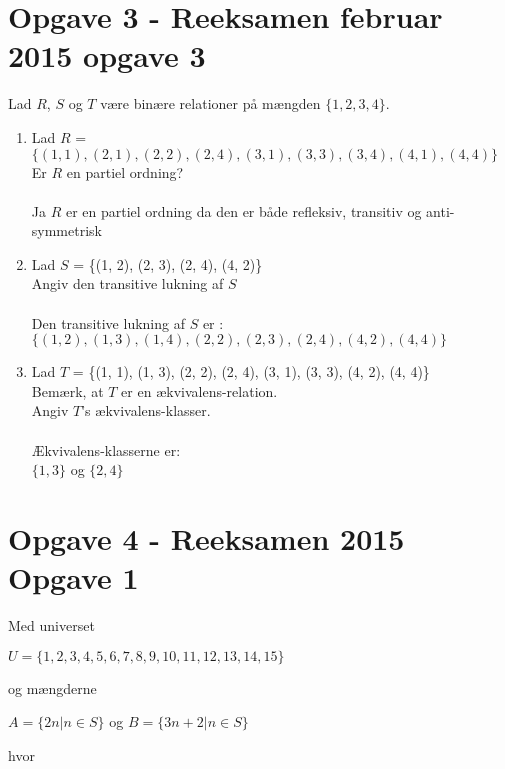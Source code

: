 \documentclass[20pt]{article}
\begin{document}
	\section*{Opgave 3 - Reeksamen februar 2015 opgave 3}
Lad \(R\), \(S\) og \(T\) være binære relationer på mængden \(\{1, 2, 3, 4\}\).
\begin{enumerate}[label=(\alph*)]
	\item 
	Lad \(R\) = \(\{(1, 1), (2, 1), (2, 2), (2, 4), (3, 1), (3, 3), (3, 4), (4, 1), (4, 4)\}\)\\
	Er \(R\) en partiel ordning?\\ \\
	Ja \(R\) er en partiel ordning da den er både refleksiv, transitiv og anti-symmetrisk\\
	\item
	Lad \(S\) = \{(1, 2), (2, 3), (2, 4), (4, 2)\}\\
	Angiv den transitive lukning af \(S\) \\ \\
	Den transitive lukning af \(S\) er : \\
	\(\{(1, 2), (1, 3), (1, 4), (2, 2), (2, 3), (2, 4), (4, 2), (4, 4)\}\)\\
	\item
	Lad \(T\) = \{(1, 1), (1, 3), (2, 2), (2, 4), (3, 1), (3, 3), (4, 2), (4, 4)\}\\
	Bemærk, at \(T\) er en ækvivalens-relation.\\
	Angiv \(T\)'s ækvivalens-klasser.\\ \\
	Ækvivalens-klasserne er:\\
	\(\{1, 3\}\) og \(\{2, 4\}\)\\
\end{enumerate}
	
\newpage	
\section*{Opgave 4 - Reeksamen 2015 Opgave 1} \par
	
\noindent Med universet

\hfil $U=\{1,2,3,4,5,6,7,8,9,10,11,12,13,14,15\}$ \par

\noindent og mængderne

\hfil $A = \{2n | n \in S\}  $ og $  B = \{3n + 2 | n \in S\}$ \par

\noindent hvor \par
\end{document}
